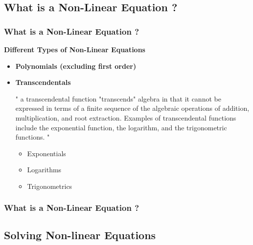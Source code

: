 \documentclass[fleqn]{ltx-talk} %
\newcommand{\sectionIsubsectionItitle}{What is a Non-Linear Equation ?}
\newcommand{\sectionIsubsectionIItitle}{Solving Non-linear Equations}
\begin{document}
		\subsection{\sectionIsubsectionItitle}\label{sectionIsubsectionI}

			\begin{frame}
				\frametitle{\sectionIsubsectionItitle}
				\bigskip

				\textbf{Different Types of Non-Linear Equations }
		
				\begin{itemize}
					\item \textbf{Polynomials (excluding first order)} \vspace{3mm}
					\item \textbf{ Transcendentals} \vspace{2mm}

					{" a transcendental function "transcends" algebra in that it cannot be expressed in terms of a finite sequence of the algebraic operations of addition, multiplication, and root extraction. Examples of transcendental functions include the exponential function, the logarithm, and the trigonometric functions. "}\\
					\begin{itemize}
						\item Exponentials \vspace{1mm}
						\item Logarithms \vspace{1mm}
						\item Trigonometrics \vspace{2mm}
					\end{itemize}

				\end{itemize}

				\btVFill
			\end{frame}

			\begin{frame}
				\frametitle{\sectionIsubsectionItitle}
				\bigskip

				\btVFill
			\end{frame}

		\subsection{\sectionIsubsectionIItitle}\label{sectionIsubsectionII}
\end{document}
